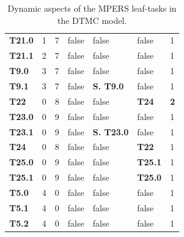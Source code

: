 \begin{table}
{\begin{tabularx}{\textwidth}{@{}lllllll@{}}
\textbf{T21.0}   & 1                & 7                  & false             & false                & false                & 1           \\
\textbf{T21.1}   & 2                & 7                  & false             & false                & false                & 1           \\
\textbf{T9.0}  & 3                  & 7                  & false             & false	        		& false                 & 1           \\
\textbf{T9.1}  & 3                  & 7                  & false             & \textbf{S. T9.0}     & false                 & 1           \\
\textbf{T22}   & 0                  & 8                  & false             & false                & \textbf{T24}                  & \textbf{2}  \\
\textbf{T23.0} & 0                  & 9                  & false             & false                & false                  & 1           \\
\textbf{T23.1} & 0                  & 9                  & false             & \textbf{S. T23.0}   & false                  & 1           \\
\textbf{T24}   & 0                  & 8                  & false             & false                & \textbf{T22}                  & 1           \\
\textbf{T25.0} & 0                  & 9                  & false             & false                & \textbf{T25.1                 } & 1           \\
\textbf{T25.1} & 0                  & 9                  & false             & false                & \textbf{T25.0}                  & 1           \\
\textbf{T5.0} & 4                   & 0                  & false             & false                & false                & 1           \\
\textbf{T5.1} & 4                   & 0                  & false             & false                & false                & 1           \\
\textbf{T5.2} & 4                   & 0                  & false             & false                & false                & 1           \\ \bottomrule
\end{tabularx}
\caption{Dynamic aspects of the MPERS leaf-tasks in the DTMC model.}
\label{tab:MPERS_DTMC_SLOTS}
}
\end{table}


